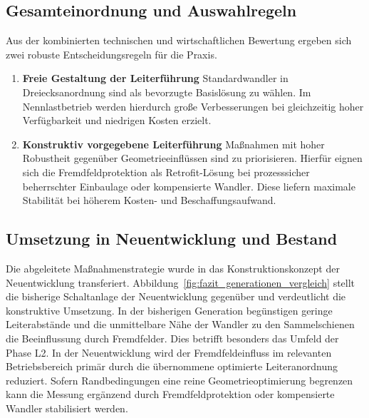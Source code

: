 \subsection*{Gesamteinordnung und Auswahlregeln}

Aus der kombinierten technischen und wirtschaftlichen Bewertung ergeben sich zwei robuste Entscheidungsregeln für die Praxis.

\begin{enumerate}
    \item \textbf{Freie Gestaltung der Leiterführung}
          Standardwandler in Dreiecksanordnung sind als bevorzugte Basislösung zu wählen. Im Nennlastbetrieb werden hierdurch große Verbesserungen bei gleichzeitig hoher Verfügbarkeit und niedrigen Kosten erzielt.
    \item \textbf{Konstruktiv vorgegebene Leiterführung}
          Maßnahmen mit hoher Robustheit gegenüber Geometrieeinflüssen sind zu priorisieren. Hierfür eignen sich die Fremdfeldprotektion als Retrofit-Lösung bei prozesssicher beherrschter Einbaulage oder kompensierte Wandler. Diese liefern maximale Stabilität bei höherem Kosten- und Beschaffungsaufwand.
\end{enumerate}

\subsection*{Umsetzung in Neuentwicklung und Bestand}

Die abgeleitete Maßnahmenstrategie wurde in das Konstruktionskonzept der Neuentwicklung transferiert. Abbildung~\ref{fig:fazit_generationen_vergleich} stellt die bisherige Schaltanlage der Neuentwicklung gegenüber und verdeutlicht die konstruktive Umsetzung. In der bisherigen Generation begünstigen geringe Leiterabstände und die unmittelbare Nähe der Wandler zu den Sammelschienen die Beeinflussung durch Fremdfelder. Dies betrifft besonders das Umfeld der Phase L2. In der Neuentwicklung wird der Fremdfeldeinfluss im relevanten Betriebsbereich primär durch die übernommene optimierte Leiteranordnung reduziert. Sofern Randbedingungen eine reine Geometrieoptimierung begrenzen kann die Messung ergänzend durch Fremdfeldprotektion oder kompensierte Wandler stabilisiert werden.

